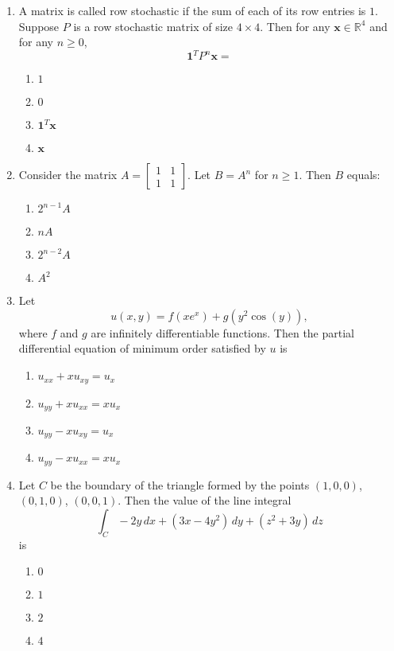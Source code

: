 \documentclass[journal]{IEEEtran}
\newcommand{\brak}[1]{\left( #1 \right)}
\begin{document}
\begin{enumerate}
  \item A matrix is called row stochastic if the sum of each of its row entries is $1$. Suppose $P$ is a row stochastic matrix of size $4 \times 4$. Then for any $\mathbf{x} \in \mathbb{R}^4$ and for any $n \geq 0$,
  \[
  \mathbf{1}^T P^n \mathbf{x} =
  \]
    \begin{enumerate}
      \item $1$
      \item $0$
      \item $\mathbf{1}^T \mathbf{x}$
      \item $\mathbf{x}$
    \end{enumerate}

  \item Consider the matrix $A = \begin{bmatrix}
        1 & 1 \\
        1 & 1
      \end{bmatrix}$. Let $B = A^n$ for $n \geq 1$. Then $B$ equals:
    \begin{enumerate}
      \item $2^{n-1} A$
      \item $nA$
      \item $2^{n-2} A$
      \item $A^2$
    \end{enumerate}

\item Let
  \[u\brak{x,y}=f\brak{xe^{x}} + g\brak{y^2\cos\brak{y}},\]
  where $f$ and $g$ are infinitely differentiable functions. Then the partial differential
  equation of minimum order satisfied by $u$ is  

  \begin{enumerate}
    \item $u_{xx} + x u_{xy} = u_{x}$
    \item $u_{yy} + x u_{xx} = x u_{x}$
    \item $u_{yy} - x u_{xy} = u_{x}$
    \item $u_{yy} - x u_{xx} = x u_{x}$
  \end{enumerate}

\item Let $C$ be the boundary of the triangle formed by the points $\brak{1,0,0}$, $\brak{0,1,0}$, $\brak{0,0,1}$. Then the value of the line integral
  \[
  \int_C -2y\, dx + \brak{3x - 4y^2}\, dy + \brak{z^2 + 3y}\, dz
  \]
  is

  \begin{enumerate}
    \item $0$
    \item $1$
    \item $2$
    \item $4$
  \end{enumerate}


\end{enumerate}
\end{document}
